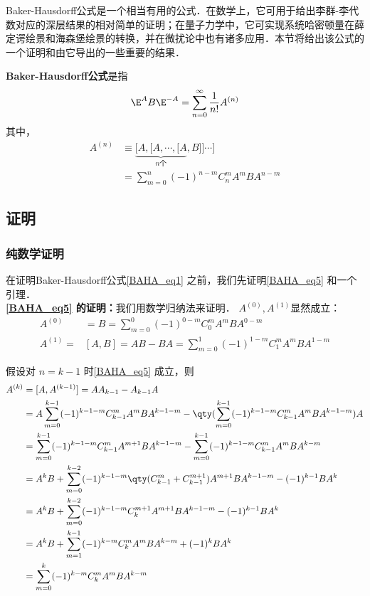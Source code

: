 \begin{issues}
\issueTODO
\end{issues}


Baker-Hausdorff公式是一个相当有用的公式．在数学上，它可用于给出李群-李代数对应的深层结果的相对简单的证明；在量子力学中，它可实现系统哈密顿量在薛定谔绘景和海森堡绘景的转换，并在微扰论中也有诸多应用．本节将给出该公式的一个证明和由它导出的一些重要的结果．

\textbf{Baker-Hausdorff公式}是指
\begin{equation}\label{BAHA_eq1}
\E ^{A}B\E^{-A}=\sum_{n=0}^{\infty}\frac{1}{n!}A^{(n)}
\end{equation}
其中，
\begin{equation}\label{BAHA_eq5}
\begin{aligned}
A^{(n)}&\equiv\underbrace{[A,[A,\cdots,[A}_{n\text{个}},B]]\cdots]\\
&=\sum_{m=0}^{n}(-1)^{n-m}C_{n}^{m}A^mBA^{n-m}
\end{aligned}
\end{equation}

\subsection{证明}
\subsubsection{纯数学证明}
在证明Baker-Hausdorff公式\autoref{BAHA_eq1} 之前，我们先证明\autoref{BAHA_eq5} 和一个引理．\\

\textbf{\autoref{BAHA_eq5} 的证明：}我们用数学归纳法来证明．
$A^{(0)},A^{(1)}$显然成立：
\begin{equation}
\begin{aligned}
A^{(0)}&=B=\sum_{m=0}^{0}(-1)^{0-m}C_{0}^{m}A^mBA^{0-m}\\
A^{(1)}=&[A,B]=AB-BA=\sum_{m=0}^{1}(-1)^{1-m}C_{1}^{m}A^mBA^{1-m}
\end{aligned}
\end{equation}

假设对 $n=k-1$ 时\autoref{BAHA_eq5} 成立，则
\begin{equation}
\begin{aligned}
A^{(k)}&=[A,A^{(k-1)}]=AA_{k-1}-A_{k-1}A\\
&=A\sum_{m=0}^{k-1}(-1)^{k-1-m}C_{k-1}^{m}A^mBA^{k-1-m}-\qty(\sum_{m=0}^{k-1}(-1)^{k-1-m}C_{k-1}^{m}A^mBA^{k-1-m})A\\
&=\sum_{m=0}^{k-1}(-1)^{k-1-m}C_{k-1}^{m}A^{m+1}BA^{k-1-m}-\sum_{m=0}^{k-1}(-1)^{k-1-m}C_{k-1}^{m}A^mBA^{k-m}\\
&=A^{k}B+\sum_{m=0}^{k-2}(-1)^{k-1-m}\qty(C_{k-1}^{m}+C_{k-1}^{m+1})A^{m+1}BA^{k-1-m}-(-1)^{k-1}BA^k\\
&=A^{k}B+\sum_{m=0}^{k-2}(-1)^{k-1-m}C_{k}^{m+1}A^{m+1}BA^{k-1-m}-(-1)^{k-1}BA^k\\
&=A^{k}B+\sum_{m=1}^{k-1}(-1)^{k-m}C_{k}^{m}A^{m}BA^{k-m}+(-1)^{k}BA^k\\
&=\sum_{m=0}^{k}(-1)^{k-m}C_{k}^{m}A^{m}BA^{k-m}
\end{aligned}
\end{equation}

